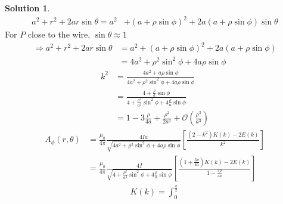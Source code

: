\documentclass[letter,12pt]{article}
\theoremstyle{definition}
\newtheorem*{sol}{Solution}
\begin{document}
\begin{enumerate}
\begin{enumerate}
\begin{sol}
\begin{align*}
                        a^2 + r^2 + 2ar \sin \theta
                        =
                        a^2 &+ {(a + \rho \sin \phi)}^2 + 2a(a + \rho \sin \phi)\sin \theta
                    \end{align*}
                    For $P$ close to the wire, $\sin \theta \approx 1$
                    \begin{align*}
                        \Rightarrow
                        a^2 + r^2 + 2ar \sin \theta
                        &=
                        a^2 + {(a + \rho \sin \phi)}^2 + 2a(a + \rho \sin \phi)
                        \\
                        &=
                        4a^2 + \rho^2 \sin^2 \phi + 4 a \rho \sin \phi
                    \end{align*}
                    \begin{align*}
                        k^2 &=
                        \frac{4a^2 + a\rho\sin\phi}
                        {4a^2 + \rho^2 \sin^2 \phi + 4 a \rho \sin \phi}
                        \\
                        &=
                        \frac{4 + \frac{\rho}{a} \sin \phi}
                        {4 + \frac{\rho^2}{a^2}\sin^2\phi + 4 \frac{\rho}{a}\sin\phi}
                        \\
                        &=
                        1 - 3 \frac{\rho}{4a} + \frac{\rho^2}{2a^2} + \mathcal{O}\left(\frac{\rho^3}{a^3}\right)
                    \end{align*}
                    \begin{align*}
                        A_\phi(r, \theta)
                        &=
                        \frac{\mu_0}{4\pi}
                        \frac{4Ia}{\sqrt{4a^2 + \rho^2 \sin^2 \phi + 4 a \rho \sin \phi}}
                        \left[
                            \frac{(2 - k^2)K(k) - 2E(k)}{k^2}
                        \right]
                        \\
                        &=
                        \frac{\mu_0}{4\pi}
                        \frac{4I}
                        {\sqrt{4 + \frac{\rho^2}{a^2} \sin^2 \phi + 4 \frac{\rho}{a} \sin \phi}}
                        \left[
                            \frac{(1 + \frac{3\rho}{4a})K(k) - 2E(k)}{1 - \frac{3\rho}{4a}}
                        \right]
                    \end{align*}
                    \begin{align*}
                        K(k) = \int_0^{\frac{\pi}{2}}

\end{align*}
\end{sol}
\end{enumerate}
\end{enumerate}
\end{document}
